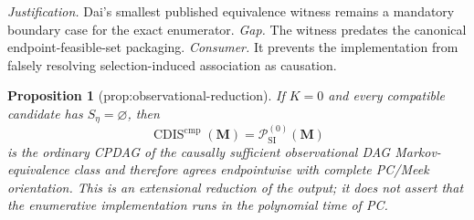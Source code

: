 \documentclass{article}
\newtheorem{proposition}{Proposition}
\begin{document}
\par\smallskip\noindent \textit{Justification.} Dai's smallest published equivalence witness remains a mandatory boundary case for the exact enumerator. \textit{Gap.} The witness predates the canonical endpoint-feasible-set packaging. \textit{Consumer.} It prevents the implementation from falsely resolving selection-induced association as causation.

\begin{proposition}[prop:observational-reduction]\label{prop:observational-reduction}
If \(K=0\) and every compatible candidate has \(S_\eta=\varnothing\), then
\[
\operatorname{CDIS}^{\mathrm{cmp}}(\mathbf M)
=\mathcal P_{\mathrm{SI}}^{(0)}(\mathbf M)
\]
is the ordinary CPDAG of the causally sufficient observational DAG Markov-equivalence class and therefore agrees endpointwise with complete PC/Meek orientation.  This is an extensional reduction of the output; it does not assert that the enumerative implementation runs in the polynomial time of PC.
\end{proposition}
\end{document}
